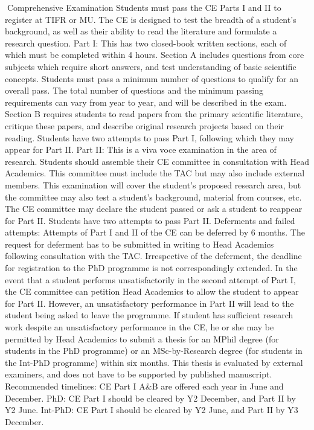 \documentclass[a4paper,10pt]{article}
\begin{document}
Comprehensive Examination
Students must pass the CE Parts I and II to register at TIFR or MU. The CE is designed to
test the breadth of a student’s background, as well as their ability to read the literature and
formulate a research question.
Part I: This has two closed-book written sections, each of which must be completed within
4 hours. Section A includes questions from core subjects which require short answers, and
test understanding of basic scientific concepts. Students must pass a minimum number of
questions to qualify for an overall pass. The total number of questions and the minimum
passing requirements can vary from year to year, and will be described in the exam. Section
B requires students to read papers from the primary scientific literature, critique these
papers, and describe original research projects based on their reading. Students have two
attempts to pass Part I, following which they may appear for Part II.
Part II: This is a viva voce examination in the area of research. Students should assemble
their CE committee in consultation with Head Academics. This committee must include the
TAC but may also include external members. This examination will cover the student’s
proposed research area, but the committee may also test a student’s background, material
from courses, etc. The CE committee may declare the student passed or ask a student to
reappear for Part II. Students have two attempts to pass Part II.
Deferments and failed attempts: Attempts of Part I and II of the CE can be deferred by 6
months. The request for deferment has to be submitted in writing to Head Academics
following consultation with the TAC. Irrespective of the deferment, the deadline for
registration to the PhD programme is not correspondingly extended. In the event that a
student performs unsatisfactorily in the second attempt of Part I, the CE committee can
petition Head Academics to allow the student to appear for Part II. However, an
unsatisfactory performance in Part II will lead to the student being asked to leave the
programme. If student has sufficient research work despite an unsatisfactory performance in
the CE, he or she may be permitted by Head Academics to submit a thesis for an MPhil
degree (for students in the PhD programme) or an MSc-by-Research degree (for students in
the Int-PhD programme) within six months. This thesis is evaluated by external examiners,
and does not have to be supported by published manuscript.
Recommended timelines:
CE Part I A&B are offered each year in June and December.
PhD: CE Part I should be cleared by Y2 December, and Part II by Y2 June.
Int-PhD: CE Part I should be cleared by Y2 June, and Part II by Y3 December.
\end{document}
